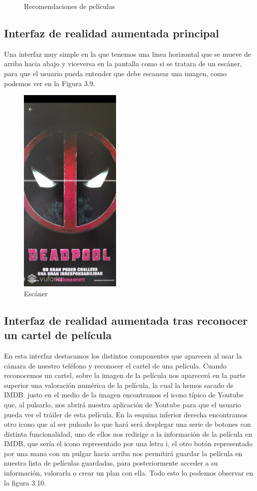 \begin{figure}[H]
{\begin{minipage}[b]{0.5\linewidth}
      \caption{Recomendaciones de películas}
    \label{svb}
    \end{minipage}%
    }%
\end{figure}

\subsection{Interfaz de realidad aumentada principal}
\label{makereference3.4.4}
Una interfaz muy simple en la que tenemos una linea horizontal que se mueve de arriba hacia abajo y viceversa en la pantalla como si se tratara de un escáner, para que el usuario
pueda entender que debe escanear una imagen, como podemos ver en la Figura 3.9.
\begin{figure}[H]
    \centering
    \includegraphics[height=4in]{figures/escaner.jpg}
    \caption{Escáner}
\end{figure}
\subsection{Interfaz de realidad aumentada tras reconocer un cartel de película}
\label{makereference3.4.4}
En esta interfaz destacamos los distintos componentes que aparecen al usar la cámara de nuestro teléfono y reconocer el cartel de una película.
Cuando reconocemos un cartel, sobre la imagen de la película nos aparecerá en la parte superior una valoración numérica de la película, la cual la hemos 
sacado de IMDB. justo en el medio de la imagen encontramos el icono típico de Youtube que, al pulsarlo, nos abrirá nuestra aplicación de Youtube para que
el usuario pueda ver el tráiler de esta película. En la esquina inferior derecha encontramos otro icono que al ser pulsado lo que hará será desplegar una serie de botones con distinta funcionalidad,
uno de ellos nos redirige a la información de la película en IMDB, que sería el icono representado por una letra i, el otro botón representado por una mano con un pulgar hacia arriba nos permitirá
guardar la película en nuestra lista de películas guardadas, para posteriormente acceder a su información, valorarla o crear un plan con ella. Todo esto lo podemos observar en la figura 3.10.

